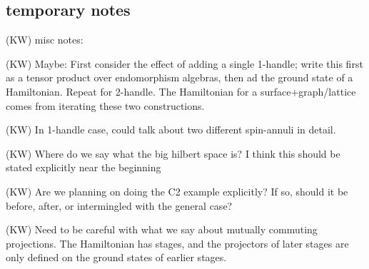\documentclass[12pt,a4paper]{article}
\newcounter{arrow}
\newcommand{\tp}{\otimes}
\newcommand{\ket}[1]{\ensuremath{\left|#1\right\rangle}}
\newcommand{\dave}[1]{{\color{ao(english)}\footnotesize{(DA) #1}}}
\newcommand{\kw}[1]{{\color{kwcolor}\footnotesize{(KW) #1}}}
\begin{document}

\subsection{temporary notes}

\kw{misc notes:}

\kw{Maybe: First consider the effect of adding a single 1-handle; write this first as a tensor product over endomorphism
algebras, then ad the ground state of a Hamiltonian.  Repeat for 2-handle.  The Hamiltonian for a surface+graph/lattice
comes from iterating these two constructions.}

\kw{In 1-handle case, could talk about two different spin-annuli in detail.}

\kw{Where do we say what the big hilbert space is?  I think this should be stated explicitly near the beginning}

\kw{Are we planning on doing the C2 example explicitly?  
If so, should it be before, after, or intermingled with the general case?}

\kw{Need to be careful with what we say about mutually commuting projections.
The Hamiltonian has stages, and the projectors of later stages are only defined on the ground
states of earlier stages.}
\end{document}
